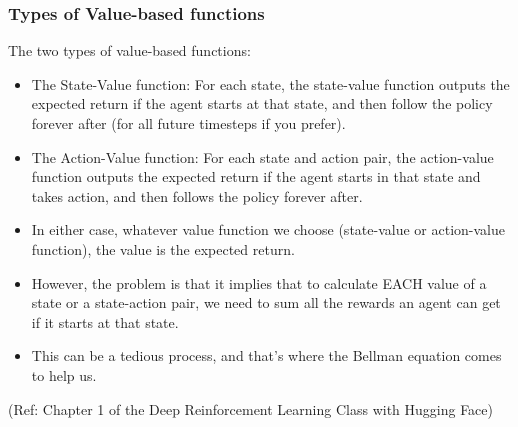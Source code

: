 \begin{frame}[fragile]\frametitle{Types of Value-based functions}

The two types of value-based functions:

\begin{itemize}
\item The State-Value function: For each state, the state-value function outputs the expected return if the agent starts at that state, and then follow the policy forever after (for all future timesteps if you prefer).
\item The Action-Value function: For each state and action pair, the action-value function outputs the expected return if the agent starts in that state and takes action, and then follows the policy forever after.
\item In either case, whatever value function we choose (state-value or action-value function), the value is the expected return.
\item However, the problem is that it implies that to calculate EACH value of a state or a state-action pair, we need to sum all the rewards an agent can get if it starts at that state.
\item This can be a tedious process, and that's where the Bellman equation comes to help us.
\end{itemize}


{\tiny (Ref: Chapter 1 of the Deep Reinforcement Learning Class with Hugging Face)}


\end{frame}

